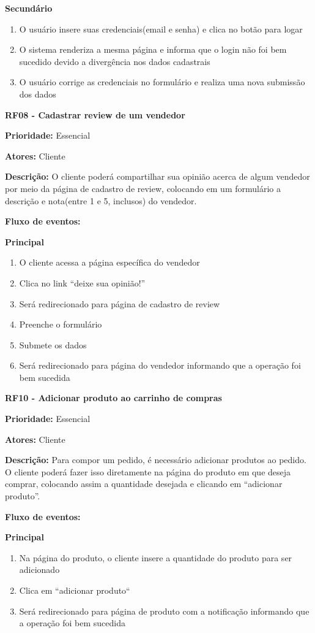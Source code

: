 \textbf{Secundário}

\begin{enumerate}
  \item O usuário insere suas credenciais(email e senha) e clica no botão para logar
  
  \item O sistema renderiza a mesma página e informa que o login não foi bem sucedido devido a divergência nos dados cadastrais
  
  \item O usuário corrige as credenciais no formulário e realiza uma nova submissão dos dados

\end{enumerate}

\textbf{RF08 - Cadastrar review de um vendedor} \par
\textbf{Prioridade:} Essencial \par
\textbf{Atores:} Cliente \par
\textbf{Descrição:} O cliente poderá compartilhar sua opinião acerca de algum vendedor por meio da página de cadastro de review, colocando em um formulário a descrição e nota(entre 1 e 5, inclusos) do vendedor. \par
\textbf{Fluxo de eventos:} \par
\textbf{Principal} \par
\begin{enumerate}
  \item O cliente acessa a página específica do vendedor
  \item Clica no link “deixe sua opinião!”
  \item Será redirecionado para página de cadastro de review
  \item Preenche o formulário
  \item Submete os dados
  \item Será redirecionado para página do vendedor informando que a operação foi bem sucedida
\end{enumerate}

\textbf{RF10 - Adicionar produto ao carrinho de compras} \par
\textbf{Prioridade:} Essencial \par
\textbf{Atores:} Cliente \par
\textbf{Descrição:} Para compor um pedido, é necessário adicionar produtos ao pedido. O cliente poderá fazer isso diretamente na página do produto em que deseja comprar, colocando assim a quantidade desejada e clicando em “adicionar produto”. \par
\textbf{Fluxo de eventos:} \par
\textbf{Principal} \par
\begin{enumerate}
  \item Na página do produto, o cliente insere a quantidade do produto para ser adicionado
  \item Clica em “adicionar produto“
  \item Será redirecionado para página de produto com a notificação informando que a operação foi bem sucedida
\end{enumerate}


